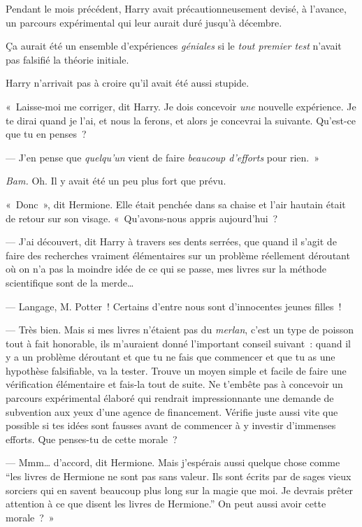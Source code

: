 Pendant le mois précédent, Harry avait précautionneusement devisé, à l'avance, un parcours expérimental qui leur aurait duré jusqu'à décembre.

Ça aurait été un ensemble d'expériences \emph{géniales} si le \emph{tout premier test} n'avait pas falsifié la théorie initiale.

Harry n'arrivait pas à croire qu'il avait été aussi stupide.

«~Laisse-moi me corriger, dit Harry.
Je dois concevoir \emph{une} nouvelle expérience.
Je te dirai quand je l'ai, et nous la ferons, et alors je concevrai la suivante.
Qu'est-ce que tu en penses~?

--- J'en pense que \emph{quelqu'un} vient de faire \emph{beaucoup d'efforts} pour rien.~»

\emph{Bam.} Oh.
Il y avait été un peu plus fort que prévu.

«~Donc~», dit Hermione.
Elle était penchée dans sa chaise et l'air hautain était de retour sur son visage.
«~Qu'avons-nous appris aujourd'hui~?

--- J'ai découvert, dit Harry à travers ses dents serrées, que quand il s'agit de faire des recherches vraiment élémentaires sur un problème réellement déroutant où on n'a pas la moindre idée de ce qui se passe, mes livres sur la méthode scientifique sont de la merde…

--- Langage, M. Potter~!
Certains d'entre nous sont d'innocentes jeunes filles~!

--- Très bien.
Mais si mes livres n'étaient pas du \emph{merlan}, c'est un type de poisson tout à fait honorable, ils m'auraient donné l'important conseil suivant~: quand il y a un problème déroutant et que tu ne fais que commencer et que tu as une hypothèse falsifiable, va la tester.
Trouve un moyen simple et facile de faire une vérification élémentaire et fais-la tout de suite.
Ne t'embête pas à concevoir un parcours expérimental élaboré qui rendrait impressionnante une demande de subvention aux yeux d'une agence de financement.
Vérifie juste aussi vite que possible si tes idées sont fausses avant de commencer à y investir d'immenses efforts.
Que penses-tu de cette morale~?

--- Mmm… d'accord, dit Hermione.
Mais j'espérais aussi quelque chose comme “les livres de Hermione ne sont pas sans valeur.
Ils sont écrits par de sages vieux sorciers qui en savent beaucoup plus long sur la magie que moi.
Je devrais prêter attention à ce que disent les livres de Hermione.” On peut aussi avoir cette morale~?~»

